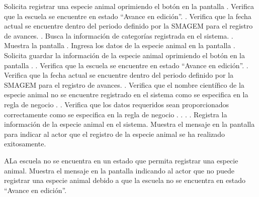  \begin{UCtrayectoria}
    \UCpaso[\UCactor] Solicita registrar una especie animal oprimiendo el botón  en la pantalla .
    \UCpaso[\UCsist] Verifica que la escuela se encuentre en estado ``Avance en edición''. .
    \UCpaso[\UCsist] Verifica que la fecha actual se encuentre dentro del periodo definido por la SMAGEM para el registro de avances. .
    \UCpaso[\UCsist] Busca la información de categorías registrada en el sistema. .
    \UCpaso[\UCsist] Muestra la pantalla .
    \UCpaso[\UCactor] Ingresa los datos de la especie animal en la pantalla . \label{cus13:Registrar}
    \UCpaso[\UCactor] Solicita guardar la información de la especie animal oprimiendo el botón  en la pantalla . .
    \UCpaso[\UCsist] Verifica que la escuela se encuentre en estado ``Avance en edición''. .
    \UCpaso[\UCsist] Verifica que la fecha actual se encuentre dentro del periodo definido por la SMAGEM para el registro de avances. .
    \UCpaso[\UCsist] Verifica que el nombre científico de la especie animal no se encuentre registrado en el sistema como se especifica en la regla de negocio . .
    \UCpaso[\UCsist] Verifica que los datos requeridos sean proporcionados correctamente como se especifica en la regla de negocio . . . .
    \UCpaso[\UCsist] Registra la información de la especie animal en el sistema.
    \UCpaso[\UCsist] Muestra el mensaje  en la pantalla  para indicar al actor que el registro de la especie animal se ha realizado exitosamente.     
 \end{UCtrayectoria}
   \begin{UCtrayectoriaA}{A}{La escuela no se encuentra en un estado que permita registrar una especie animal.}
    \UCpaso[\UCsist] Muestra el mensaje  en la pantalla  indicando al actor que no puede registrar una especie animal debido a que la escuela no se encuentra en estado ``Avance en edición''. 
 \end{UCtrayectoriaA}

